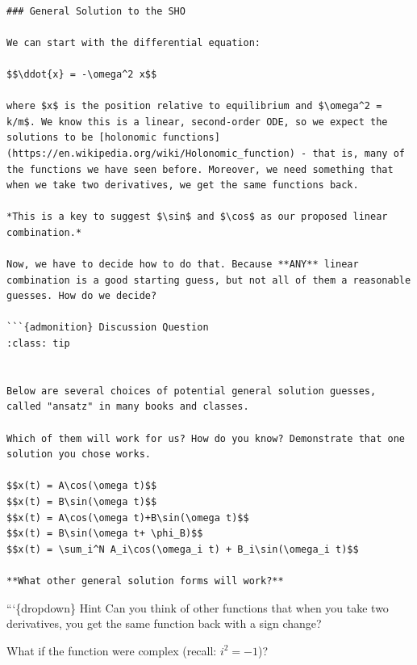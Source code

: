 \begin{verbatim}

### General Solution to the SHO

We can start with the differential equation:

$$\ddot{x} = -\omega^2 x$$

where $x$ is the position relative to equilibrium and $\omega^2 = k/m$. We know this is a linear, second-order ODE, so we expect the solutions to be [holonomic functions](https://en.wikipedia.org/wiki/Holonomic_function) - that is, many of the functions we have seen before. Moreover, we need something that when we take two derivatives, we get the same functions back.

*This is a key to suggest $\sin$ and $\cos$ as our proposed linear combination.*

Now, we have to decide how to do that. Because **ANY** linear combination is a good starting guess, but not all of them a reasonable guesses. How do we decide? 

```{admonition} Discussion Question
:class: tip


Below are several choices of potential general solution guesses, called "ansatz" in many books and classes. 

Which of them will work for us? How do you know? Demonstrate that one solution you chose works.

$$x(t) = A\cos(\omega t)$$
$$x(t) = B\sin(\omega t)$$
$$x(t) = A\cos(\omega t)+B\sin(\omega t)$$
$$x(t) = B\sin(\omega t+ \phi_B)$$
$$x(t) = \sum_i^N A_i\cos(\omega_i t) + B_i\sin(\omega_i t)$$

**What other general solution forms will work?** 
\end{verbatim}

```\{dropdown\} Hint Can you think of other functions that when you take
two derivatives, you get the same function back with a sign change?

What if the function were complex (recall: \(i^2 = -1\))?

